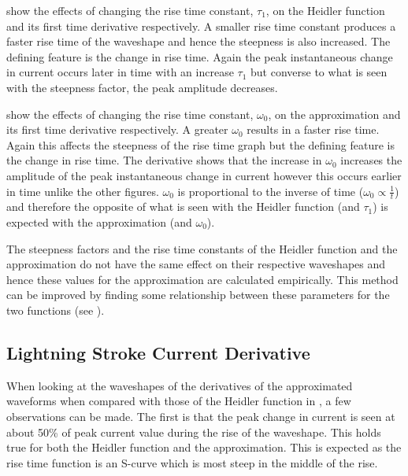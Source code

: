  show the effects of changing the rise time constant, $\tau_1$, on the Heidler function and its first time derivative respectively. A smaller rise time constant produces a faster rise time of the waveshape and hence the steepness is also increased. The defining feature is the change in rise time. Again the peak instantaneous change in current occurs later in time with an increase $\tau_1$ but converse to what is seen with the steepness factor, the peak amplitude decreases.

 show the effects of changing the rise time constant, $\omega_0$, on the approximation and its first time derivative respectively. A greater $\omega_0$ results in a faster rise time. Again this affects the steepness of the rise time graph but the defining feature is the change in rise time. The derivative shows that the increase in $\omega_0$ increases the amplitude of the peak instantaneous change in current however this occurs earlier in time unlike the other figures. $\omega_0$ is proportional to the inverse of time ($\omega_0 \propto \frac{1}{t}$) and therefore the opposite of what is seen with the Heidler function (and $\tau_1$) is expected with the approximation (and $\omega_0$).

The steepness factors and the rise time constants of the Heidler function and the approximation do not have the same effect on their respective waveshapes and hence these values for the approximation are calculated empirically. This method can be improved by finding some relationship between these parameters for the two functions (see ).

\subsection{Lightning Stroke Current Derivative}
\label{sub:discussion_stroke_current_derivative}
When looking at the waveshapes of the derivatives of the approximated waveforms when compared with those of the Heidler function in , a few observations can be made. The first is that the peak change in current is seen at about 50\% of peak current value during the rise of the waveshape. This holds true for both the Heidler function and the approximation. This is expected as the rise time function is an S-curve which is most steep in the middle of the rise.

